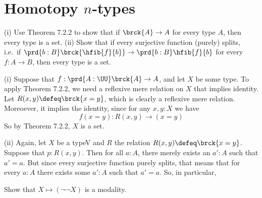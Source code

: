 \begin{coqdoccode}
\end{coqdoccode}
\section{Homotopy $n$-types}



(i) Use Theorem 7.2.2 to show that if $\brck{A} \to A$ for every type $A$, then
    every type is a set.
(ii) Show that if every surjective function (purely) splits, i.e.~if
    $\prd{b:B}\brck{\hfib{f}{b}} \to \prd{b:B}\hfib{f}{b}$ for every $f : A \to
    B$, then every type is a set.


 \soln
(i)  Suppose that $f : \prd{A:\UU}\brck{A} \to A$, and let $X$ be some type. To
apply Theorem 7.2.2, we need a reflexive mere relation on $X$ that implies
identity.  Let $R(x, y) \defeq \brck{x = y}$, which is clearly a reflexive mere
relation.  Moreoever, it implies the identity, since for any $x, y : X$ we have
\[
  f(x = y) : R(x, y) \to (x = y)
\]
So by Theorem 7.2.2, $X$ is a set.


(ii)  Again, let $X$ be a typeV and $R$ the relation $R(x, y) \defeq \brck{x =
y}$.  Suppose that $p : R(x, y)$.  Then for all $a : A$, there merely exists an
$a' : A$ such that $a' = a$.  But since every surjective function purely
splits, that means that for every $a : A$ there exists some $a' : A$ such that
$a' = a$.  So, in particular, 




                    

Show that $X \mapsto (\lnot \lnot X)$ is a modality.


